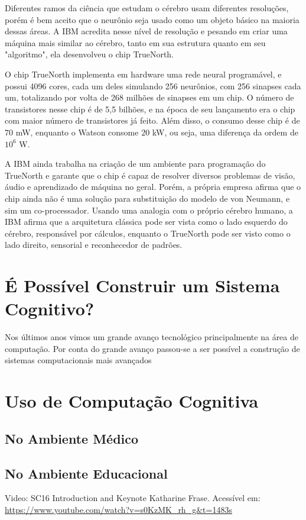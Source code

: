 \documentclass[12pt]{article}
\begin{document}
Diferentes ramos da ciência que estudam o cérebro usam diferentes 
resoluções, porém é bem aceito que o neurônio seja usado como um objeto
básico na maioria dessas áreas. A IBM acredita nesse nível de resolução
e pesando em criar uma máquina mais similar ao cérebro, tanto em sua
estrutura quanto em seu "algoritmo", ela desenvolveu o chip TrueNorth.

O chip TrueNorth implementa em hardware uma rede neural programável, e 
possui 4096 cores, cada um deles simulando 256 neurônios, com 256
sinapses cada um, totalizando por volta de 268 milhões de sinapses em
um chip. O número de transistores nesse chip é de 5,5 bilhões, e na 
época de seu lançamento era o chip com maior número de transistores já
feito. Além disso, o consumo desse chip é de $70$ mW, enquanto
o Watson consome $20$ kW, ou seja, uma diferença da ordem de $10 ^ 6$ W.

A IBM ainda trabalha na criação de um ambiente para programação do 
TrueNorth e garante que o chip é capaz de resolver diversos problemas
de visão, áudio e aprendizado de máquina no geral. Porém, a própria
empresa afirma que o chip ainda não é uma solução para substituição do
modelo de von Neumann, e sim um co-processador. Usando uma analogia com
o próprio cérebro humano, a IBM afirma que a arquitetura clássica pode
ser vista como o lado esquerdo do cérebro, responsável por cálculos,
enquanto o TrueNorth pode ser visto como o lado direito, sensorial e
reconhecedor de padrões.

\pagebreak
\section{É Possível Construir um Sistema Cognitivo?}
Nos últimos anos vimos um grande avanço tecnológico principalmente na
área de computação. Por conta do grande avanço passou-se a ser possível
a construção de sistemas computacionais mais avançados

\pagebreak
\section{Uso de Computação Cognitiva}
\subsection{No Ambiente Médico}
\subsection{No Ambiente Educacional}


\pagebreak
\begin{thebibliography}{1}
 Video: SC16 Introduction and Keynote
    Katharine Frase. Acessível em: 
    \url{https://www.youtube.com/watch?v=s0KzMK_rh_g&t=1483s}
\end{thebibliography}
\end{document}
